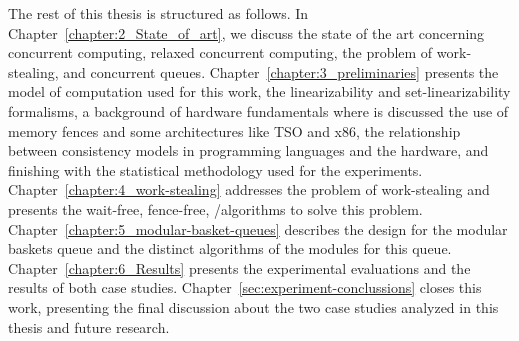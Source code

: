 The rest of this thesis is structured as follows. In Chapter~\ref{chapter:2_State_of_art}, we discuss the state of the art concerning concurrent computing, relaxed concurrent computing, the problem of work-stealing, and concurrent queues. Chapter~\ref{chapter:3_preliminaries} presents the model of computation used for this work, the linearizability and set-linearizability formalisms, a background of hardware fundamentals where is discussed the use of memory fences and some architectures like TSO and x86, the relationship between consistency models in programming languages and the hardware, and finishing with the statistical methodology used for the experiments. Chapter~\ref{chapter:4_work-stealing} addresses the problem of work-stealing and presents the wait-free, fence-free, \R/\W algorithms to solve this problem. Chapter~\ref{chapter:5_modular-basket-queues} describes the design for the modular baskets queue and the distinct algorithms of the modules for this queue. Chapter~\ref{chapter:6_Results} presents the experimental evaluations and the results of both case studies. Chapter~\ref{sec:experiment-conclussions} closes this work, presenting the final discussion about the two case studies analyzed in this thesis and future research.

